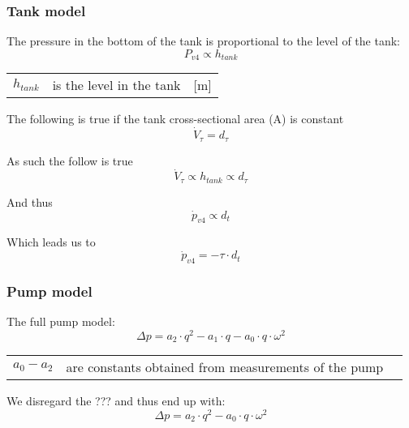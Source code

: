 \documentclass{article}
\begin{document}
\subsubsection{Tank model}
The pressure in the bottom of the tank is proportional to the level of the tank:
\begin{equation}
	P_{v4} \propto h_{tank}
\end{equation}

\begin{center}
	\begin{tabular}{l p{8cm} l}
		$h_{tank}$ & is the level in the tank & [\si{m}]\\
	\end{tabular}
\end{center}

The following is true if the tank cross-sectional area (A) is constant
\begin{equation}
	\dot V_{\tau} = d_{\tau}
\end{equation}

As such the follow is true
\begin{equation}
		\dot V_{\tau} \propto h_{tank} \propto d_{\tau}
\end{equation}

And thus
\begin{equation}
	\dot p_{v4} \propto d_t
\end{equation}

Which leads us to
\begin{equation}
	\dot p_{v4} = -\tau \cdot d_t
\end{equation}


\subsubsection{Pump model}

The full pump model:
\begin{equation}
	\Delta p = a_2 \cdot q^2 - a_1 \cdot q - a_0 \cdot q \cdot \omega^2
\end{equation}

\begin{center}
	\begin{tabular}{l p{8cm} l}
		$a_0 - a_2$ & are constants obtained from measurements of the pump \\
	\end{tabular}
\end{center}

We disregard the ??? and thus end up with:
\begin{equation}
	\Delta p = a_2 \cdot q^2 - a_0 \cdot q \cdot \omega^2
\end{equation}
\end{document}
